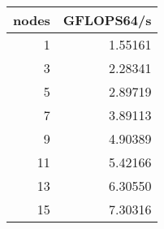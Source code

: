 \begin{tabular}{rr}
\toprule
 nodes &  GFLOPS64/s \\
\midrule
     1 &     1.55161 \\
     3 &     2.28341 \\
     5 &     2.89719 \\
     7 &     3.89113 \\
     9 &     4.90389 \\
    11 &     5.42166 \\
    13 &     6.30550 \\
    15 &     7.30316 \\
\bottomrule
\end{tabular}
